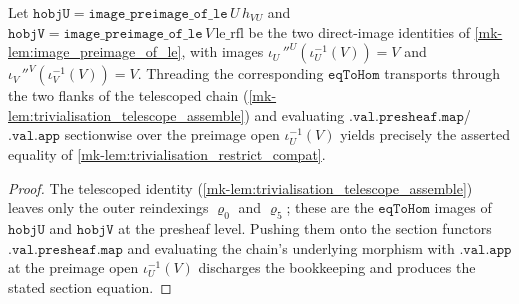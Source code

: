 \begin{lemma}\label{mk-lem:trivialisation_restrict_sectionwise}
  \leanok

  Let \(\mathtt{hobjU} = \mathtt{image\_preimage\_of\_le}\,U\,h_{VU}\) and
  \(\mathtt{hobjV} = \mathtt{image\_preimage\_of\_le}\,V\,\mathrm{le\_rfl}\) be the two direct-image
  identities of \ref{mk-lem:image_preimage_of_le}, with images \(\iota_U\,''^U(\iota_U^{-1}(V)) = V\) and
  \(\iota_V\,''^V(\iota_V^{-1}(V)) = V\). Threading the corresponding \(\mathtt{eqToHom}\) transports
  through the two flanks of the telescoped chain (\ref{mk-lem:trivialisation_telescope_assemble}) and
  evaluating \(\mathtt{.val.presheaf.map}\)/\(\mathtt{.val.app}\) sectionwise over the preimage open
  \(\iota_U^{-1}(V)\) yields precisely the asserted equality of
  \ref{mk-lem:trivialisation_restrict_compat}.
\end{lemma}
\begin{proof}
  \leanok
  The telescoped identity (\ref{mk-lem:trivialisation_telescope_assemble}) leaves only the outer
  reindexings \(\varrho_0\) and \(\varrho_5\); these are the \(\mathtt{eqToHom}\) images of
  \(\mathtt{hobjU}\) and \(\mathtt{hobjV}\) at the presheaf level. Pushing them onto the section
  functors \(\mathtt{.val.presheaf.map}\) and evaluating the chain's underlying morphism with
  \(\mathtt{.val.app}\) at the preimage open \(\iota_U^{-1}(V)\) discharges the bookkeeping and produces
  the stated section equation.
\end{proof}

